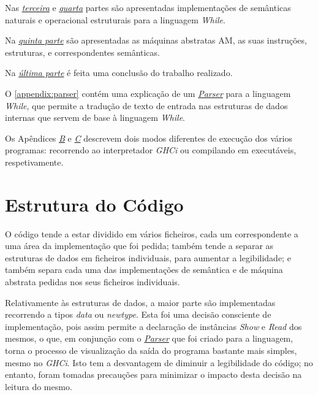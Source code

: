 \documentclass[11pt,a4paper]{report}
\newcommand{\while}[0]{\textit{While}\xspace}
\newcommand{\ghci}[0]{\textit{GHCi}\xspace}
\newcommand{\data}[0]{\textit{data}\xspace}
\newcommand{\parser}[0]{\hyperref[appendix:parser]{\textit{Parser}}\xspace}
\newcommand{\classshow}[0]{\textit{Show}\xspace}
\newcommand{\classread}[0]{\textit{Read}\xspace}
\begin{document}
\par Nas \hyperref[chapter:semantica-natural]{\textit{terceira}} e \hyperref[chapter:semantica-small-step]{\textit{quarta}} partes são apresentadas implementações de semânticas naturais e operacional estruturais para a linguagem \while.

\par Na \hyperref[chapter:maquinas-abstratas]{\textit{quinta parte}} são apresentadas as máquinas abstratas AM, as suas instruções, estruturas, e correspondentes semânticas.

\par Na \hyperref[chapter:concl]{\textit{última parte}} é feita uma conclusão do trabalho realizado.

\par O \autoref{appendix:parser} contém uma explicação de um \parser para a linguagem \while, que permite a tradução de texto de entrada nas estruturas de dados internas que servem de base à linguagem \while.

\par Os Apêndices \hyperref[appendix:interpretador]{\textit{B}} e \hyperref[appendix:compilar]{\textit{C}} descrevem dois modos diferentes de execução dos vários programas: recorrendo ao interpretador \ghci ou compilando em executáveis, respetivamente.

\section{Estrutura do Código} \label{section:estrutura-codigo}

\par O código tende a estar dividido em vários ficheiros, cada um correspondente a uma área da implementação que foi pedida; também tende a separar as estruturas de dados em ficheiros individuais, para aumentar a legibilidade; e também separa cada uma das implementações de semântica e de máquina abstrata pedidas nos seus ficheiros individuais.

\par \label{paragraph:razao-tipos-explicitos} Relativamente às estruturas de dados, a maior parte são implementadas recorrendo a tipos \data ou \textit{newtype}. Esta foi uma decisão consciente de implementação, pois assim permite a declaração de instâncias \classshow e \classread dos mesmos, o que, em conjunção com o \parser que foi criado para a linguagem, torna o processo de visualização da saída do programa bastante mais simples, mesmo no \ghci. Isto tem a desvantagem de diminuir a legibilidade do código; no entanto, foram tomadas precauções para minimizar o impacto desta decisão na leitura do mesmo.
\end{document}
